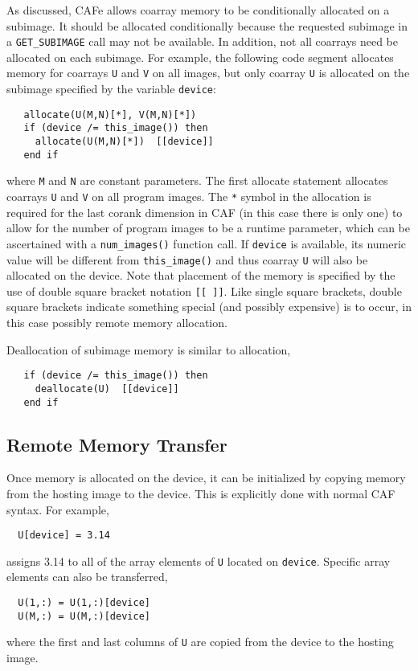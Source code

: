 As discussed, CAFe allows coarray memory to be conditionally allocated on a subimage.
It should be allocated conditionally because the requested subimage in a \texttt{GET\_SUBIMAGE}
call may not be available.  In addition, not all coarrays need be allocated on each
subimage.  For example, the following code segment allocates memory for coarrays
\texttt{U} and \texttt{V} on all images, but only coarray \texttt{U} is allocated on
the subimage specified by the variable \texttt{device}:
\begin{verbatim}
   allocate(U(M,N)[*], V(M,N)[*])
   if (device /= this_image()) then
     allocate(U(M,N)[*])  [[device]]
   end if
\end{verbatim}
where \texttt{M} and \texttt{N} are constant parameters.  The first allocate statement
allocates coarrays \texttt{U} and \texttt{V} on all program images.  The \texttt{*} symbol
in the allocation is required for the last corank dimension in CAF (in this case there is
only one) to allow for the number of program images to be a runtime parameter, which can
be ascertained with a \texttt{num\_images()} function call.  If \texttt{device} is
available, its numeric value will be different from \texttt{this\_image()} and thus
coarray \texttt{U} will also be allocated on the device.  Note that placement of the
memory is specified by the use of double square bracket notation \texttt{[[ ]]}.  Like
single square brackets, double square brackets indicate something special (and possibly
expensive) is to occur, in this case possibly remote memory allocation.

Deallocation of subimage memory is similar to allocation,
\begin{verbatim}
   if (device /= this_image()) then
     deallocate(U)  [[device]]
   end if
\end{verbatim}


\subsection{Remote Memory Transfer}

Once memory is allocated on the device, it can be initialized by copying memory from the
hosting image to the device.  This is explicitly done with normal CAF syntax.  For example,
\begin{verbatim}
  U[device] = 3.14
\end{verbatim}
assigns 3.14 to all of the array elements of \texttt{U} located on \texttt{device}.
Specific array elements can also be transferred, 
\begin{verbatim}
  U(1,:) = U(1,:)[device]
  U(M,:) = U(M,:)[device]
\end{verbatim}
where the first and last columns of \texttt{U} are copied from the device to the hosting image.

